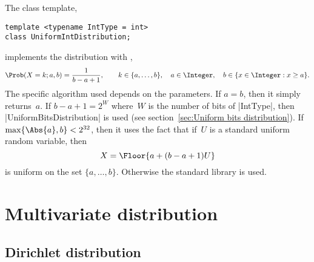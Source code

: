 The class template,
\begin{verbatim}
template <typename IntType = int>
class UniformIntDistribution;
\end{verbatim}
implements the distribution with \pdf,
\begin{equation*}
  \Prob(X = k;a,b) = \frac{1}{b - a + 1},\qquad
  k \in \{a,\dots,b\},\quad
  a \in \Integer,\quad b \in \{x \in \Integer: x \ge a\}.
\end{equation*}
The specific algorithm used depends on the parameters. If $a = b$, then it
simply returns~$a$. If $b - a + 1 = 2^W$ where~$W$ is the number of bits of
|IntType|, then |UniformBitsDistribution| is used (see section~\ref{sec:Uniform
bits distribution}). If $\max\{\Abs{a}, b\} < 2^{32}$, then it uses the fact
that if~$U$ is a standard uniform random variable, then
\begin{equation*}
  X = \Floor{a + (b - a + 1) U}
\end{equation*}
is uniform on the set $\{a,\dots,b\}$. Otherwise the standard library is used.

\section{Multivariate distribution}
\label{sec:Multivariate distribution}

\subsection{Dirichlet distribution}
\label{sub:Dirichlet distribution}

